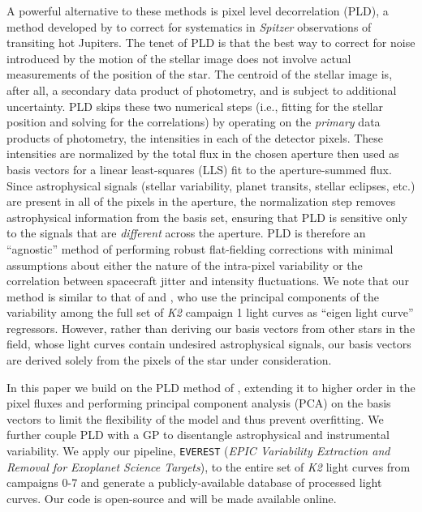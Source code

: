 \documentclass[]{emulateapj}
\begin{document}
A powerful alternative to these methods is pixel level decorrelation (PLD), a method developed
by \cite{DEM15} to correct for systematics in \emph{Spitzer} observations of transiting
hot Jupiters. The tenet of PLD is that the best way to correct for noise introduced by
the motion of the stellar image does not involve actual measurements of the position
of the star. The centroid of the stellar image is, after all, a secondary data product
of photometry, and is subject to additional uncertainty.
PLD skips these two numerical steps (i.e., fitting for the stellar position and solving
for the correlations) by operating on the \emph{primary} data products of photometry, the
intensities in each of the detector pixels. 
These intensities are normalized by the
total flux in the chosen aperture then used as basis vectors for a linear least-squares 
(LLS) fit to the aperture-summed flux. Since astrophysical signals (stellar variability,
planet transits, stellar eclipses, etc.) are present in all of the pixels in the aperture,
the normalization step removes astrophysical information from the basis set, ensuring
that PLD is sensitive only to the signals that are \emph{different} across the aperture. PLD is
therefore an ``agnostic'' method of performing robust flat-fielding corrections with
minimal assumptions about either the nature of the intra-pixel variability or the correlation 
between spacecraft jitter and intensity fluctuations. We note that our method is similar 
to that of \cite{DFM15} and \cite{MON15}, who use the principal components of the variability 
among the full set of \emph{K2} campaign 1 light curves as ``eigen light curve'' regressors.
However, rather than deriving our basis vectors from other stars in the field, whose
light curves contain undesired astrophysical signals, our basis vectors are derived
solely from the pixels of the star under consideration.

In this paper we build on the PLD method of \cite{DEM15}, extending it to higher order
in the pixel fluxes and performing principal component analysis (PCA) on the basis
vectors to limit the flexibility of the model and thus prevent overfitting. We further 
couple PLD with a GP to 
disentangle astrophysical and instrumental variability. 
%
%
%
We apply our pipeline, \texttt{EVEREST}
(\emph{EPIC Variability Extraction and Removal for
Exoplanet Science Targets}), to the entire set of \emph{K2} light curves from campaigns 0-7 and generate a 
publicly-available database of processed light curves. Our code is open-source and will be made
available online.
\end{document}

